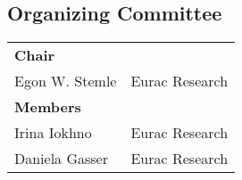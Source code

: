 \documentclass[a4paper, onesided]{easychair}
\begin{document}
\bigskip
\subsection*{Organizing Committee}
\begin{longtable}{p{}p{}}
       \hline {\bf Chair} \medskip \\
    Egon W. Stemle & Eurac Research %
       \bigskip\\ \hline {\bf Members} \medskip \\ 
    Irina Iokhno & Eurac Research\\
    Daniela Gasser & Eurac Research\\
\end{longtable}
\clearpage
\pagestyle{main}
{}%
\end{document}
